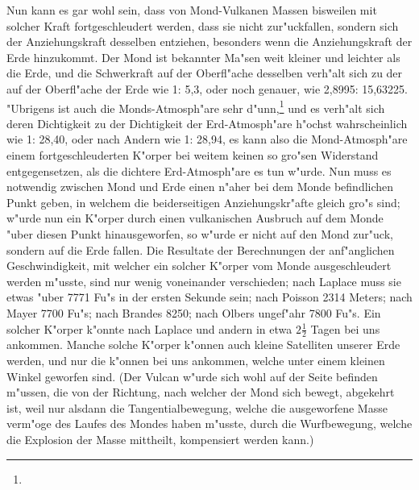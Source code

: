 \documentclass[a4paper, 11pt, oneside, polutonikogreek, german]{article}
\begin{document}
Nun kann es gar wohl sein, dass von Mond-Vulkanen Massen bisweilen mit solcher Kraft fortgeschleudert werden, dass sie nicht zur"uckfallen, sondern sich der Anziehungskraft desselben entziehen, besonders wenn die Anziehungskraft der Erde hinzukommt. Der Mond ist bekannter Ma"sen weit kleiner und leichter als die Erde, und die Schwerkraft auf der Oberfl"ache desselben verh"alt sich zu der auf der Oberfl"ache der Erde wie 1: 5,3, oder noch genauer, wie 2,8995: 15,63225. "Ubrigens ist auch die Monds-Atmosph"are sehr d"unn,\footnote{} und es verh"alt sich deren Dichtigkeit zu der Dichtigkeit der Erd-Atmosph"are h"ochst wahrscheinlich wie 1: 28,40, oder nach Andern wie 1: 28,94, es kann also die Mond-Atmosph"are einem fortgeschleuderten K"orper bei weitem keinen so gro"sen Widerstand entgegensetzen, als die dichtere Erd-Atmosph"are es tun w"urde. Nun muss es notwendig zwischen Mond und Erde einen n"aher bei dem Monde befindlichen Punkt geben, in welchem die beiderseitigen Anziehungskr"afte gleich gro"s sind; w"urde nun ein K"orper durch einen vulkanischen Ausbruch auf dem Monde "uber diesen Punkt hinausgeworfen, so w"urde er nicht auf den Mond zur"uck, sondern auf die Erde fallen. Die Resultate der Berechnungen der anf"anglichen Geschwindigkeit, mit welcher ein solcher K"orper vom Monde ausgeschleudert werden m"usste, sind nur wenig voneinander verschieden; nach Laplace muss sie etwas "uber 7771 Fu"s in der ersten Sekunde sein; nach Poisson 2314 Meters; nach Mayer 7700 Fu"s; nach Brandes 8250; nach Olbers ungef"ahr 7800 Fu"s. Ein solcher K"orper k"onnte nach Laplace und andern in etwa $\mathfrak{2\frac{1}{2}}$ Tagen bei uns ankommen. Manche solche K"orper k"onnen auch kleine Satelliten unserer Erde werden, und nur die k"onnen bei uns ankommen, welche unter einem kleinen Winkel geworfen sind. (Der Vulcan w"urde sich wohl auf der Seite befinden m"ussen, die von der Richtung, nach welcher der Mond sich bewegt, abgekehrt ist, weil nur alsdann die Tangentialbewegung, welche die ausgeworfene Masse verm"oge des Laufes des Mondes haben m"usste, durch die Wurfbewegung, welche die Explosion der Masse mittheilt, kompensiert werden kann.)
\end{document}
